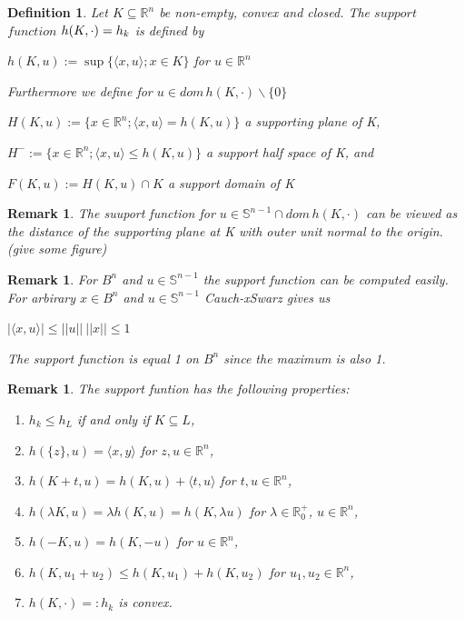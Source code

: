 \documentclass[a4paper]{book}
\newtheorem{remark}[theorem]{Remark}%
\newtheorem{definition}[theorem]{Definition}%
\numberwithin{theorem}{section}%
\begin{document}
\begin{definition}
    Let $K\subseteq\mathbb{R}^n$ be non-empty, convex and closed. The $support$ $function$ $h(K,\cdot\space)=h_k$ is defined by
    \begin{center}
        $h(K,u):=\sup\{\langle x,u\rangle;x\in K\}$ for $u\in\mathbb{R}^n$
    \end{center}
    Furthermore we define for $u\in dom\,h(K,\cdot)\backslash\{0\}$
    \begin{center}
        $H(K,u):=\{x\in\mathbb{R}^n;\langle x,u\rangle=h(K,u)\}$ a supporting plane of K,
        
        $H^{-}:=\{x\in\mathbb{R}^n;\langle x,u\rangle\leq h(K,u)\}$ a support half space of K, and 
        
        $F(K,u):=H(K,u)\cap K$ a support domain of K
    \end{center}
\end{definition}

\begin{remark}
    The suuport function for $u\in\mathbb{S}^{n-1}\cap dom\,h(K,\cdot)$ can be viewed as the distance of the supporting plane at K with outer unit normal to the origin.(give some figure)
\end{remark}

\begin{remark}
    For $B^{n}$ and $u\in\mathbb{S}^{n-1}$ the support function can be computed easily. For arbirary $x\in B^{n}$ and $u\in\mathbb{S}^{n-1}$ Cauch-xSwarz gives us
    \begin{center}
        $|\langle x,u\rangle|\leq||u||\:||x||\leq1$
    \end{center}
    The support function is equal 1 on $B^{n}$ since the maximum is also 1.
\end{remark}

\begin{remark}
    The support funtion has the following properties:
    \begin{enumerate}
        \item $h_{k}\leq h_{L}$ if and only if $K\subseteq L$,
        \item $h(\{z\},u)=\langle x,y\rangle$ for $z,u\in\mathbb{R}^{n}$,
        \item $h(K+t,u)=h(K,u)+\langle t,u\rangle$ for $t,u\in\mathbb{R}^{n}$,
        \item $h(\lambda K, u)=\lambda h(K,u)=h(K,\lambda u)$ for $\lambda\in\mathbb{R}_{0}^{+}$, $u\in\mathbb{R}^{n}$,
        \item $h(-K,u)=h(K,-u)$ for $u\in\mathbb{R}^{n}$,
        \item $h(K,u_{1}+u_{2})\leq h(K,u_{1})+h(K,u_{2})$ for $u_{1},u_{2}\in\mathbb{R}^{n}$,
        \item $h(K,\cdot)=: h_{k}$ is convex.
    \end{enumerate}
\end{remark}
\end{document}
